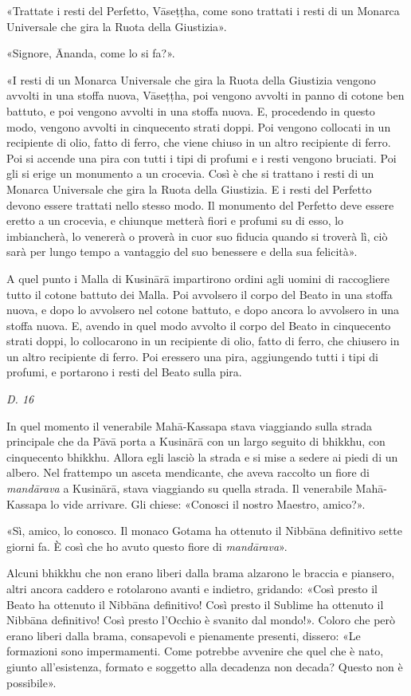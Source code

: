 «Trattate i resti del Perfetto, Vāseṭṭha, come sono trattati i resti di
un Monarca Universale che gira la Ruota della Giustizia».


«Signore, Ānanda, come lo si fa?».


«I resti di un Monarca Universale che gira la Ruota della Giustizia
vengono avvolti in una stoffa nuova, Vāseṭṭha, poi vengono avvolti in
panno di cotone ben battuto, e poi vengono avvolti in una stoffa nuova.
E, procedendo in questo modo, vengono avvolti in cinquecento strati doppi.
Poi vengono collocati in un recipiente di olio, fatto di ferro, che
viene chiuso in un altro recipiente di ferro. Poi si accende una pira
con tutti i tipi di profumi e i resti vengono bruciati. Poi gli si erige
un monumento a un crocevia. Così è che si trattano i resti di un Monarca
Universale che gira la Ruota della Giustizia. E i resti del Perfetto
devono essere trattati nello stesso modo. Il monumento del Perfetto deve
essere eretto a un crocevia, e chiunque metterà fiori e profumi su di
esso, lo imbiancherà, lo venererà o proverà in cuor suo fiducia quando
si troverà lì, ciò sarà per lungo tempo a vantaggio del suo benessere e
della sua felicità».


A quel punto i Malla di Kusinārā impartirono ordini agli uomini di
raccogliere tutto il cotone battuto dei Malla. Poi avvolsero il corpo
del Beato in una stoffa nuova, e dopo lo avvolsero nel cotone battuto, e
dopo ancora lo avvolsero in una stoffa nuova. E, avendo in quel modo
avvolto il corpo del Beato in cinquecento strati doppi, lo collocarono
in un recipiente di olio, fatto di ferro, che chiusero in un altro
recipiente di ferro. Poi eressero una pira, aggiungendo tutti i tipi di
profumi, e portarono i resti del Beato sulla pira.


\emph{D. 16}


In quel momento il venerabile Mahā-Kassapa stava viaggiando sulla strada
principale che da Pāvā porta a Kusinārā con un largo seguito di bhikkhu,
con cinquecento bhikkhu. Allora egli lasciò la strada e si mise a sedere
ai piedi di un albero. Nel frattempo un asceta mendicante, che aveva
raccolto un fiore di \emph{mandārava} a Kusinārā, stava viaggiando su quella
strada. Il venerabile Mahā-Kassapa lo vide arrivare. Gli chiese:
«Conosci il nostro Maestro, amico?».


«Sì, amico, lo conosco. Il monaco Gotama ha ottenuto il Nibbāna
definitivo sette giorni fa. È così che ho avuto questo fiore di
\emph{mandārava}».


Alcuni bhikkhu che non erano liberi dalla brama alzarono le braccia e
piansero, altri ancora caddero e rotolarono avanti e indietro, gridando:
«Così presto il Beato ha ottenuto il Nibbāna definitivo! Così presto il
Sublime ha ottenuto il Nibbāna definitivo! Così presto l’Occhio è
svanito dal mondo!». Coloro che però erano liberi dalla brama,
consapevoli e pienamente presenti, dissero: «Le formazioni sono
impermamenti. Come potrebbe avvenire che quel che è nato, giunto
all’esistenza, formato e soggetto alla decadenza non decada? Questo non
è possibile».


